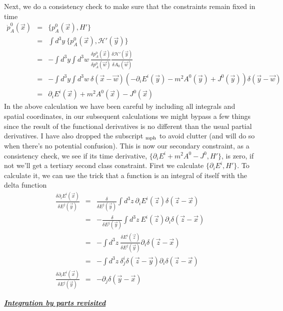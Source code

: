\documentclass[aps,preprint,preprintnumbers,nofootinbib,showpacs,prd]{revtex4-1}
\newcommand{\nbea}{\begin{eqnarray*}}
\newcommand{\neea}{\end{eqnarray*}}
\begin{document}
Next, we do a consistency check to make sure that the constraints remain fixed in time
%
\nbea
\dot p^0_A(\vec x) & = & \{p^0_A(\vec x), H'\} \\
& = & \int d^3y~\{p^0_A(\vec x), \mathcal{H}'(\vec y)\} \\
& = & -\int d^3y \int d^3w~\frac{\delta p^0_A(\vec x)}{\delta p^0_A(\vec w)} \frac{\delta \mathcal{H}'(\vec y)}{\delta A_0(\vec w)} \\
& = & -\int d^3y \int d^3w~\delta (\vec x-\vec w) (-\partial_i E^{i}(\vec y) - m^2 A^0(\vec y) + J^0(\vec y))\delta(\vec y - \vec w) \\
& = & \partial_i E^{i}(\vec x) + m^2 A^0(\vec x) - J^0(\vec x)
\neea
%
In the above calculation we have been careful by including all integrals and spatial coordinates, in our subsequent calculations we might bypass a few things since the result of the functional derivatives is no different than the usual partial derivatives. I have also dropped the subscript $_{\rm mph}$ to avoid clutter (and will do so when there's no potential confusion). This is now our secondary constraint, as a consistency check, we see if its time derivative, $\{\partial_i E^{i} + m^2 A^0 - J^0, H'\}$, is zero, if not we'll get a tertiary second class constraint. First we calculate $\{\partial_i E^{i}, H'\}$. To calculate it, we can use the trick that a function is an integral of itself with the delta function
%
\nbea
\frac{\delta \partial_i E^i(\vec x)}{\delta E^j(\vec y)} & = & \frac{\delta}{\delta E^j(\vec y)}\int d^3z~\partial_i E^i(\vec z) \delta(\vec z-\vec x)   \\
& = & -\frac{\delta}{\delta E^j(\vec y)}\int d^3z~ E^i(\vec z) \partial_i \delta(\vec z-\vec x) \\
& = & -\int d^3z~ \frac{\delta E^i(\vec z)}{\delta E^j(\vec y)} \partial_i \delta(\vec z-\vec x) \\
& = & -\int d^3z~ \delta^i_j \delta (\vec z-\vec y) \partial_i \delta(\vec z-\vec x) \\
\frac{\delta \partial_i E^i(\vec x)}{\delta E^j(\vec y)} & = & -\partial_j \delta (\vec y-\vec x) 
\neea
%

\bigskip
\underline{\textbf{\textit{Integration by parts revisited}}}
\end{document}
